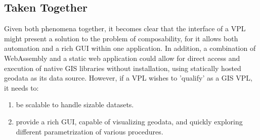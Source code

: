 








\subsection{Taken Together}

Given both phenomena together, it becomes clear that the interface of a \ac{VPL} might present a solution to the problem of composability, for it allows both automation and a rich \ac{GUI} within one application. 
In addition, a combination of WebAssembly and a static web application could allow for direct access and execution of native \ac{GIS} libraries without installation, using statically hosted geodata as its data source. 
However, if a VPL wishes to 'qualify' as a GIS VPL, it needs to:
\begin{enumerate}
  \item be scalable to handle sizable datasets.
  \item provide a rich \ac{GUI}, capable of visualizing geodata, and quickly exploring different parametrization of various procedures.
\end{enumerate}

